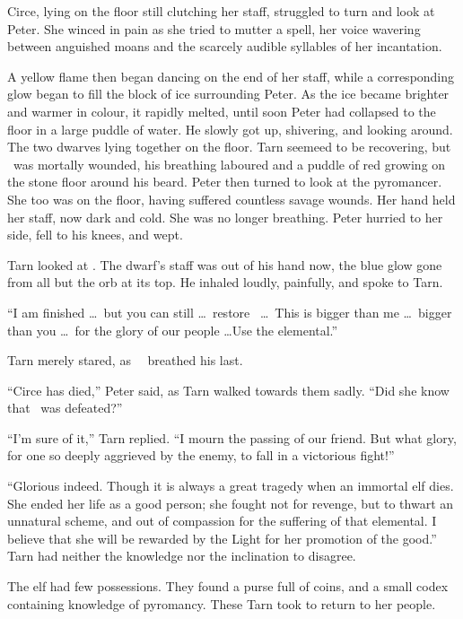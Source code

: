 Circe, lying on the floor still clutching her staff, struggled to turn and look at Peter.  She winced in pain as she tried to mutter a spell, her voice wavering between anguished moans and the scarcely audible syllables of her incantation.

A yellow flame then began dancing on the end of her staff, while a corresponding glow began to fill the block of ice surrounding Peter.  As the ice became brighter and warmer in colour, it rapidly melted, until soon Peter had collapsed to the floor in a large puddle of water.  He slowly got up, shivering, and looking around.  The two dwarves lying together on the floor.  Tarn seemeed to be recovering, but \mothzam\ was mortally wounded, his breathing laboured and a puddle of red growing on the stone floor around his beard.  Peter then turned to look at the pyromancer.  She too was on the floor, having suffered countless savage wounds.  Her hand held her staff, now dark and cold.  She was no longer breathing.  Peter hurried to her side, fell to his knees, and wept.

Tarn looked at \mothzam.  The dwarf's staff was out of his hand now, the blue glow gone from all but the orb at its top.  He inhaled loudly, painfully, and spoke to Tarn.

``I am finished \ldots\ but you can still \ldots\ restore \valdunmir\ \ldots\ This is bigger than me \ldots\ bigger than you \ldots\ for the glory of our people \ldots Use the elemental.''

Tarn merely stared, as \mothzam\ \driktur\ breathed his last.

``Circe has died,'' Peter said, as Tarn walked towards them sadly.  ``Did she know that \mothzam\ was defeated?''

``I'm sure of it,'' Tarn replied.  ``I mourn the passing of our friend.  But what glory, for one so deeply aggrieved by the enemy, to fall in a victorious fight!''

``Glorious indeed.  Though it is always a great tragedy when an immortal elf dies.  She ended her life as a good person; she fought not for revenge, but to thwart an unnatural scheme, and out of compassion for the suffering of that elemental.  I believe that she will be rewarded by the Light for her promotion of the good.''  Tarn had neither the knowledge nor the inclination to disagree.

The elf had few possessions.  They found a purse full of coins, and a small codex containing knowledge of pyromancy.  These Tarn took to return to her people.

